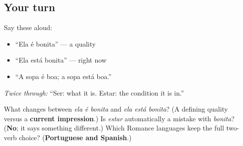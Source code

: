 \subsection*{Your turn}
Say these aloud:

\begin{itemize}
\raggedright
  \item “Ela é bonita” — a quality
  \item “Ela está bonita” — right now
  \item “A sopa é boa; a sopa está boa.”
\end{itemize}

\emph{Twice through:} “Ser: what it is. Estar: the condition it is in.”

\begin{tcolorbox}[breakable,colback=teal!4,colframe=teal!35!black,title={Before you move on}]
What changes between \emph{ela é bonita} and \emph{ela está bonita}? (A defining quality versus a \textbf{current impression}.) Is \emph{estar} automatically a mistake with \emph{bonita}? (\textbf{No}; it says something different.) Which Romance languages keep the full two-verb choice? (\textbf{Portuguese and Spanish}.)
\end{tcolorbox}
